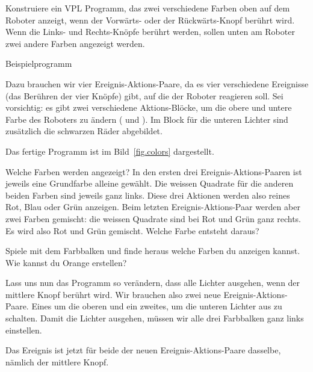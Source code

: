 
Konstruiere ein VPL Programm, das zwei verschiedene Farben oben auf dem Roboter
anzeigt, wenn der Vorwärts- oder der Rückwärts-Knopf berührt wird. Wenn die
Links- und Rechts-Knöpfe berührt werden, sollen unten am Roboter zwei andere
Farben angezeigt werden.

{\raggedleft \hfill Beispielprogramm }

Dazu brauchen wir vier Ereignis-Aktions-Paare, da es vier verschiedene
Ereignisse (das Berühren der vier Knöpfe) gibt, auf die der Roboter reagieren
soll. Sei vorsichtig: es gibt zwei verschiedene Aktions-Blöcke, um die obere
und untere Farbe des Roboters zu ändern ( und
). Im Block für die unteren Lichter sind zusätzlich die
schwarzen Räder abgebildet.

Das fertige Programm ist im Bild~\ref{fig.colors} dargestellt.

Welche Farben werden angezeigt? In den ersten drei Ereignis-Aktions-Paaren ist
jeweils eine Grundfarbe alleine gewählt. Die weissen Quadrate für die anderen
beiden Farben sind jeweils ganz links. Diese drei Aktionen werden also reines
Rot, Blau oder Grün anzeigen. Beim letzten Ereignis-Aktions-Paar werden aber
zwei Farben gemischt: die weissen Quadrate sind bei Rot und Grün ganz rechts.
Es wird also Rot und Grün gemischt. Welche Farbe entsteht daraus?


Spiele mit dem Farbbalken und finde heraus welche Farben du anzeigen kannst.
Wie kannst du Orange erstellen?


Lass uns nun das Programm so verändern, dass alle Lichter ausgehen, wenn der
mittlere Knopf berührt wird. Wir brauchen also zwei neue
Ereignis-Aktions-Paare. Eines um die oberen und ein zweites,
um die unteren Lichter aus zu schalten. Damit die Lichter ausgehen, müssen wir alle drei
Farbbalken ganz links einstellen.

Das Ereignis ist jetzt für beide der neuen Ereignis-Aktions-Paare dasselbe,
nämlich der mittlere Knopf.



